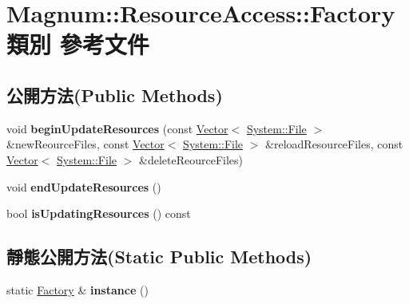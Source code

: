 \hypertarget{class_magnum_1_1_resource_access_1_1_factory}{}\section{Magnum\+:\+:Resource\+Access\+:\+:Factory 類別 參考文件}
\label{class_magnum_1_1_resource_access_1_1_factory}
\subsection*{公開方法(Public Methods)}
\begin{DoxyCompactItemize}
\item 
void {\bfseries begin\+Update\+Resources} (const \hyperlink{class_magnum_1_1_vector}{Vector}$<$ \hyperlink{class_magnum_1_1_system_1_1_file}{System\+::\+File} $>$ \&new\+Reource\+Files, const \hyperlink{class_magnum_1_1_vector}{Vector}$<$ \hyperlink{class_magnum_1_1_system_1_1_file}{System\+::\+File} $>$ \&reload\+Resource\+Files, const \hyperlink{class_magnum_1_1_vector}{Vector}$<$ \hyperlink{class_magnum_1_1_system_1_1_file}{System\+::\+File} $>$ \&delete\+Reource\+Files)\hypertarget{class_magnum_1_1_resource_access_1_1_factory_ad6e6a9cafa12c57971906f8e6f38943b}{}\label{class_magnum_1_1_resource_access_1_1_factory_ad6e6a9cafa12c57971906f8e6f38943b}

\item 
void {\bfseries end\+Update\+Resources} ()\hypertarget{class_magnum_1_1_resource_access_1_1_factory_add020acb918bfaeae32ef48842cd4e9d}{}\label{class_magnum_1_1_resource_access_1_1_factory_add020acb918bfaeae32ef48842cd4e9d}

\item 
bool {\bfseries is\+Updating\+Resources} () const \hypertarget{class_magnum_1_1_resource_access_1_1_factory_adb0bafd78cfac5fe795b1688e0b2f33c}{}\label{class_magnum_1_1_resource_access_1_1_factory_adb0bafd78cfac5fe795b1688e0b2f33c}

\end{DoxyCompactItemize}
\subsection*{靜態公開方法(Static Public Methods)}
\begin{DoxyCompactItemize}
\item 
static \hyperlink{class_magnum_1_1_resource_access_1_1_factory}{Factory} \& {\bfseries instance} ()\hypertarget{class_magnum_1_1_resource_access_1_1_factory_a54e05402ab08c2a2041e5d1877566357}{}\label{class_magnum_1_1_resource_access_1_1_factory_a54e05402ab08c2a2041e5d1877566357}

\end{DoxyCompactItemize}
